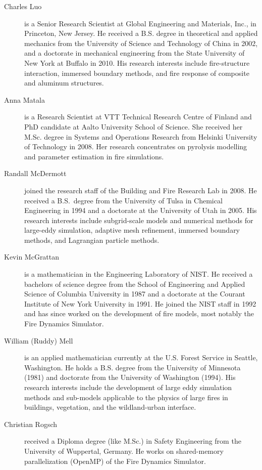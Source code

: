 \begin{description}
\item[Charles Luo] is a Senior Research Scientist at Global Engineering and Materials, Inc., in Princeton, New Jersey. He received a B.S. degree in theoretical and applied mechanics from the University of Science and Technology of China in 2002, and a doctorate in mechanical engineering from the State University of New York at Buffalo in 2010. His research interests include fire-structure interaction, immersed boundary methods, and fire response of composite and aluminum structures.

\item[Anna Matala] is a Research Scientist at VTT Technical Research Centre of Finland and PhD candidate at Aalto University School of Science. She received her M.Sc. degree in Systems and Operations Research from Helsinki University of Technology in 2008. Her research concentrates on pyrolysis modelling and parameter estimation in fire simulations.

\item[Randall McDermott] joined the research staff of the Building and Fire Research Lab in 2008. He received a B.S.~degree from the University of Tulsa in Chemical Engineering in 1994 and a doctorate at the University of Utah in 2005. His research interests include subgrid-scale models and numerical methods for large-eddy simulation, adaptive mesh refinement, immersed boundary methods, and Lagrangian particle methods.

\item[Kevin McGrattan] is a mathematician in the Engineering Laboratory of NIST. He received a bachelors of science degree from the School of Engineering and Applied Science of Columbia University in 1987 and a doctorate at the Courant Institute of New York University in 1991. He joined the NIST staff in 1992 and has since worked on the development of fire models, most notably the Fire Dynamics Simulator.

\item[William (Ruddy) Mell] is an applied mathematician currently at the U.S. Forest Service in Seattle, Washington. He holds a B.S. degree from the University of Minnesota (1981) and doctorate from the University of Washington (1994). His research interests include the development of large eddy simulation methods and sub-models applicable to the physics of large fires in buildings, vegetation, and the wildland-urban interface.

\item[Christian Rogsch] received a Diploma degree (like M.Sc.) in Safety Engineering from the University of Wuppertal, Germany. He works on shared-memory parallelization (OpenMP) of the Fire Dynamics Simulator.


\end{description}
